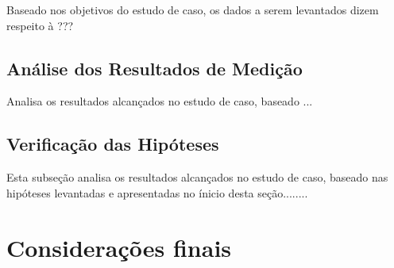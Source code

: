 Baseado nos objetivos do estudo de caso, os dados a serem levantados dizem respeito à ???

\subsection{Análise dos Resultados de Medição}

Analisa os resultados alcançados no estudo de caso, baseado ...

\subsection{Verificação das Hipóteses}

Esta subseção analisa os resultados alcançados no estudo de caso, baseado nas hipóteses levantadas e apresentadas no ínicio desta seção........


\section{Considerações finais}







